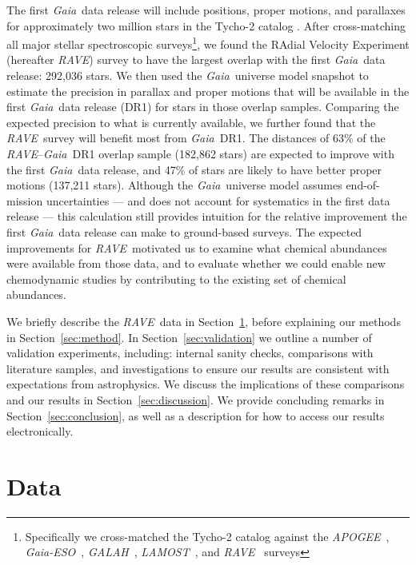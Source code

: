 \documentclass[preprint,trackchanges]{aastex}
\newcommand{\acronym}[1]{{\small{#1}}}
\newcommand{\project}[1]{\textsl{#1}}
\newcommand{\gaia}{\project{Gaia}}
\newcommand{\rave}{\project{\acronym{RAVE}}}
\newcommand{\galah}{\project{\acronym{GALAH}}}
\newcommand{\ges}{\project{Gaia-ESO}}
\newcommand{\apogee}{\project{\acronym{APOGEE}}}
\newcommand{\lamost}{\project{\acronym{LAMOST}}}
\begin{document}
The first \gaia\ data release will include positions, proper motions, and 
parallaxes for approximately two million stars in the Tycho-2 \citep{Hog_2000} 
catalog \citep{Michalik_2015a,Michalik_2015b}.  After cross-matching all major 
stellar spectroscopic surveys\footnote{Specifically we cross-matched the Tycho-2
catalog against the \apogee\ \citep{Zasowski_2013}, \ges\
\citep{Gilmore_2012,Randich_2013}, \galah\ \citep{DeSilva_2015},
\lamost\ \citep{Cui_2012}, and \rave\ \citep{Steinmetz_2006} 
surveys}, we found the RAdial Velocity Experiment (hereafter \rave) survey to 
have the largest overlap with the first \gaia\ data release: 292,036 
stars.  We then used the \gaia\ universe model snapshot \citep{Robin_2012} to 
estimate the precision in parallax and proper motions that will be available in 
the first \gaia\ data release (DR1) for stars in those overlap samples.  Comparing
the expected precision to what is currently available, we further found that the
\rave\ survey will benefit most from \gaia\ DR1.  The distances of 63\% of the 
\rave--\gaia\ DR1 overlap sample (182,862 stars) are expected to improve with 
the first \gaia\ data release, and 47\% of stars are likely to have better 
proper motions (137,211 stars).  Although the \gaia\ universe model assumes 
end-of-mission uncertainties --- and does not account for systematics in the first
data release --- this calculation still provides intuition for the relative 
improvement the first \gaia\ data release can make to ground-based surveys.  The 
expected improvements for \rave\ motivated us to examine what chemical abundances
were available from those data, and to evaluate whether we could enable new 
chemodynamic studies by contributing to the existing set of chemical abundances.


We briefly describe the \rave\ data in Section~\ref{sec:data}, before explaining
our methods in Section~\ref{sec:method}.  In Section~\ref{sec:validation}
we outline a number of validation experiments, including: internal sanity checks,
comparisons with literature samples, and investigations to ensure our results
are consistent with expectations from astrophysics.  We discuss the implications
of these comparisons and our results in Section~\ref{sec:discussion}.  We provide
concluding remarks in Section~\ref{sec:conclusion}, as well as a description for
how to access our results electronically.



\section{Data}
\label{sec:data}
\end{document}
